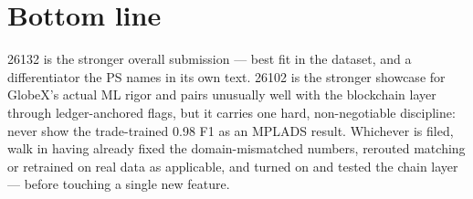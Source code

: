\documentclass[11pt]{article}
\begin{document}
\section*{Bottom line}
26132 is the stronger overall submission --- best fit in the dataset, and a differentiator the PS names in
its own text. 26102 is the stronger showcase for GlobeX's actual ML rigor and pairs unusually well with the
blockchain layer through ledger-anchored flags, but it carries one hard, non-negotiable discipline: never
show the trade-trained 0.98 F1 as an MPLADS result. Whichever is filed, walk in having already fixed the
domain-mismatched numbers, rerouted matching or retrained on real data as applicable, and turned on and
tested the chain layer --- before touching a single new feature.
\end{document}
